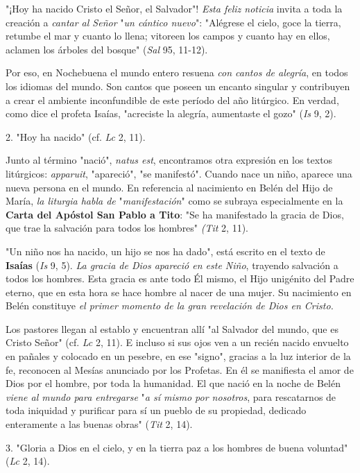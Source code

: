 \begin{body}
\begin{body}
"¡Hoy ha nacido Cristo el Señor, el Salvador"! \emph{Esta feliz noticia} invita a toda la creación a \emph{cantar al Señor} "\emph{un cántico nuevo}": "Alégrese el cielo, goce la tierra, retumbe el mar y cuanto lo llena; vitoreen los campos y cuanto hay en ellos, aclamen los árboles del bosque" (\emph{Sal} 95, 11-12).

Por eso, en Nochebuena el mundo entero resuena \emph{con cantos de alegría}, en todos los idiomas del mundo. Son cantos que poseen un encanto singular y contribuyen a crear el ambiente inconfundible de este período del año litúrgico. En verdad, como dice el profeta Isaías, "acreciste la alegría, aumentaste el gozo" (\emph{Is} 9, 2).

2. "Hoy ha nacido" (cf. \emph{Lc} 2, 11).

Junto al término "nació", \emph{natus est}, encontramos otra expresión en los textos litúrgicos: \emph{apparuit}, "apareció", "se manifestó". Cuando nace un niño, aparece una nueva persona en el mundo. En referencia al nacimiento en Belén del Hijo de María, \emph{la liturgia habla de} "\emph{manifestación}" como se subraya especialmente en la \textbf{Carta del Apóstol San Pablo a Tito}: "Se ha manifestado la gracia de Dios, que trae la salvación para todos los hombres" \emph{(Tit} 2, 11).

"Un niño nos ha nacido, un hijo se nos ha dado", está escrito en el texto de \textbf{Isaías} (\emph{Is} 9, 5). \emph{La gracia de Dios apareció en este Niño}, trayendo salvación a todos los hombres. Esta gracia es ante todo Él mismo, el Hijo unigénito del Padre eterno, que en esta hora se hace hombre al nacer de una mujer. Su nacimiento en Belén constituye \emph{el primer momento de la gran revelación de Dios en Cristo.}

Los pastores llegan al establo y encuentran allí "al Salvador del mundo, que es Cristo Señor" (cf. \emph{Lc} 2, 11). E incluso si sus ojos ven a un recién nacido envuelto en pañales y colocado en un pesebre, en ese "signo", gracias a la luz interior de la fe, reconocen al Mesías anunciado por los Profetas. En él se manifiesta el amor de Dios por el hombre, por toda la humanidad. El que nació en la noche de Belén \emph{viene al mundo para entregarse} "\emph{a sí mismo por nosotros}, para rescatarnos de toda iniquidad y purificar para sí un pueblo de su propiedad, dedicado enteramente a las buenas obras" (\emph{Tit} 2, 14).

3. "Gloria a Dios en el cielo, y en la tierra paz a los hombres de buena voluntad" (\emph{Lc} 2, 14).


\end{body}
\end{body}
